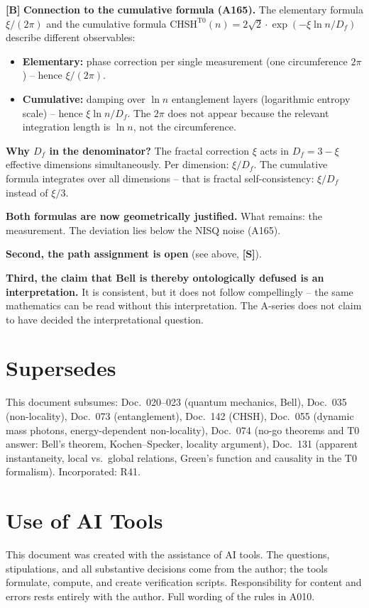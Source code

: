 \textbf{[B]} \textbf{Connection to the cumulative formula (A165).}
The elementary formula $\xi/(2\pi)$ and the cumulative formula
$\text{CHSH}^{\text{T0}}(n)=2\sqrt2\cdot\exp(-\xi\ln n/D_f)$
describe different observables:
\begin{itemize}[leftmargin=2em,itemsep=1pt,topsep=2pt]
  \item \textbf{Elementary:} phase correction per single measurement (one
    circumference $2\pi$) -- hence $\xi/(2\pi)$.
  \item \textbf{Cumulative:} damping over $\ln n$ entanglement layers (logarithmic
    entropy scale) -- hence $\xi\ln n/D_f$. The $2\pi$ does not appear because
    the relevant integration length is $\ln n$, not the circumference.
\end{itemize}
\textbf{Why $D_f$ in the denominator?} The fractal correction $\xi$ acts in
$D_f=3-\xi$ effective dimensions simultaneously. Per dimension: $\xi/D_f$.
The cumulative formula integrates over all dimensions -- that is fractal
self-consistency: $\xi/D_f$ instead of $\xi/3$.

\textbf{Both formulas are now geometrically justified.} What remains: the
measurement. The deviation lies below the NISQ noise (A165).

\textbf{Second, the path assignment is open} (see above, \textbf{[S]}).

\textbf{Third, the claim that Bell is thereby ontologically defused is an
interpretation.} It is consistent, but it does not follow compellingly -- the
same mathematics can be read without this interpretation. The A-series does not
claim to have decided the interpretational question.

\section{Supersedes}

This document subsumes: Doc.~020--023 (quantum mechanics, Bell), Doc.~035
(non-locality), Doc.~073 (entanglement), Doc.~142 (CHSH), Doc.~055 (dynamic
mass photons, energy-dependent non-locality), Doc.~074 (no-go theorems and T0
answer: Bell's theorem, Kochen--Specker, locality argument), Doc.~131 (apparent
instantaneity, local vs.\ global relations, Green's function and causality in the
T0 formalism). Incorporated: R41.

\section{Use of AI Tools}

This document was created with the assistance of AI tools. The questions,
stipulations, and all substantive decisions come from the author; the tools
formulate, compute, and create verification scripts.
Responsibility for content and errors rests entirely with the author.
Full wording of the rules in A010.
